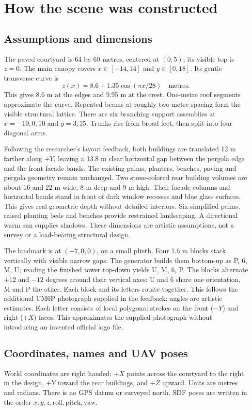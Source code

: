 \section{How the scene was constructed}
\subsection{Assumptions and dimensions}
The paved courtyard is 64 by 60 metres, centered at $(0,5)$; its visible top is $z=0$. The main canopy covers $x\in[-14,14]$ and $y\in[0,18]$. Its gentle transverse curve is
\[
 z(x)=8.6+1.35\cos(\pi x/28)\quad\text{metres}.
\]
This gives 8.6 m at the edges and 9.95 m at the crest. One-metre roof segments approximate the curve. Repeated beams at roughly two-metre spacing form the visible structural lattice. There are six branching support assemblies at $x=-10,0,10$ and $y=3,15$. Trunks rise from broad feet, then split into four diagonal arms.

Following the researcher's layout feedback, both buildings are translated 12 m farther along $+Y$, leaving a 13.8 m clear horizontal gap between the pergola edge and the front facade bands. The existing palms, planters, benches, paving and pergola geometry remain unchanged. Two stone-colored rear building volumes are about 16 and 22 m wide, 8 m deep and 9 m high. Their facade columns and horizontal bands stand in front of dark window recesses and blue glass surfaces. This gives real geometric depth without detailed interiors. Six simplified palms, raised planting beds and benches provide restrained landscaping. A directional warm sun supplies shadows. These dimensions are artistic assumptions, not a survey or a load-bearing structural design.

The landmark is at $(-7,0,0)$, on a small plinth. Four 1.6 m blocks stack vertically with visible narrow gaps. The generator builds them bottom-up as P, 6, M, U; reading the finished tower top-down yields U, M, 6, P. The blocks alternate $+12$ and $-12$ degrees around their vertical axes: U and 6 share one orientation, M and P the other. Each block and its letters rotate together. This follows the additional UM6P photograph supplied in the feedback; angles are artistic estimates. Each letter consists of local polygonal strokes on the front ($-Y$) and right ($+X$) faces. This approximates the supplied photograph without introducing an invented official logo file.

\subsection{Coordinates, names and UAV poses}
World coordinates are right handed: $+X$ points across the courtyard to the right in the design, $+Y$ toward the rear buildings, and $+Z$ upward. Units are metres and radians. There is no GPS datum or surveyed north. SDF poses are written in the order $x,y,z,\mathrm{roll},\mathrm{pitch},\mathrm{yaw}$.

